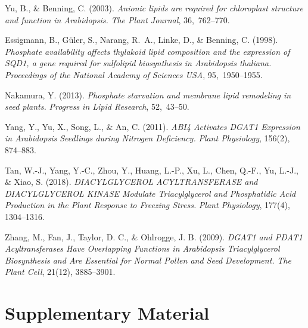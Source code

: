 \documentclass[10pt,letterpaper]{article}
\newcommand{\beginsupplement}{%
  \setcounter{table}{0}%
  \renewcommand{\thetable}{S\arabic{table}}%
  \setcounter{figure}{0}%
  \renewcommand{\thefigure}{S\arabic{figure}}}
\begin{document}
\begin{thebibliography}{10}
Yu, B., \& Benning, C. (2003).  
\emph{Anionic lipids are required for chloroplast structure and function in Arabidopsis.}  
\textit{The Plant Journal}, 36, 762–770.

Essigmann, B., Güler, S., Narang, R. A., Linke, D., \& Benning, C. (1998).  
\emph{Phosphate availability affects thylakoid lipid composition and the expression of SQD1, a gene required for sulfolipid biosynthesis in Arabidopsis thaliana.}  
\textit{Proceedings of the National Academy of Sciences USA}, 95, 1950–1955.

Nakamura, Y. (2013).  
\emph{Phosphate starvation and membrane lipid remodeling in seed plants.}  
\textit{Progress in Lipid Research}, 52, 43–50.

Yang, Y., Yu, X., Song, L., \& An, C. (2011).  
\emph{ABI4 Activates DGAT1 Expression in Arabidopsis Seedlings during Nitrogen Deficiency.}  
\textit{Plant Physiology}, 156(2), 874–883.

Tan, W.-J., Yang, Y.-C., Zhou, Y., Huang, L.-P., Xu, L., Chen, Q.-F., Yu, L.-J., \& Xiao, S. (2018).  
\emph{DIACYLGLYCEROL ACYLTRANSFERASE and DIACYLGLYCEROL KINASE Modulate Triacylglycerol and Phosphatidic Acid Production in the Plant Response to Freezing Stress.}  
\textit{Plant Physiology}, 177(4), 1304–1316.

Zhang, M., Fan, J., Taylor, D. C., \& Ohlrogge, J. B. (2009).  
\emph{DGAT1 and PDAT1 Acyltransferases Have Overlapping Functions in Arabidopsis Triacylglycerol Biosynthesis and Are Essential for Normal Pollen and Seed Development.}  
\textit{The Plant Cell}, 21(12), 3885–3901.

\end{thebibliography}

\FloatBarrier
\section*{Supplementary Material}
\beginsupplement
\end{document}

